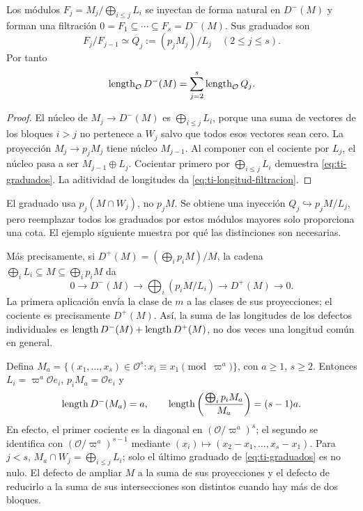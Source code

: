 \begin{proposicion}
\label{prop:ti-filtracion}
Los módulos $F_j=M_j/\bigoplus_{i\le j}L_i$ se inyectan de forma
natural en $D^-(M)$ y forman una filtración
$0=F_1\subseteq\cdots\subseteq F_s=D^-(M)$.
Sus graduados son
\begin{equation}
 F_j/F_{j-1}\simeq Q_j:=(p_jM_j)/L_j\quad(2\le j\le s).
 \label{eq:ti-graduados}
\end{equation}
Por tanto
\begin{equation}
 \operatorname{length}_{\mathcal O}D^-(M)=\sum_{j=2}^s\operatorname{length}_{\mathcal O}Q_j.
 \label{eq:ti-longitud-filtracion}
\end{equation}
\end{proposicion}
\begin{proof}
El núcleo de $M_j\to D^-(M)$ es $\bigoplus_{i\le j}L_i$,
porque una suma de vectores de los bloques $i>j$ no pertenece
a $W_j$ salvo que todos esos vectores sean cero.
La proyección $M_j\to p_jM_j$ tiene núcleo $M_{j-1}$.
Al componer con el cociente por $L_j$, el núcleo pasa a ser
$M_{j-1}\oplus L_j$. Cocientar primero por
$\bigoplus_{i\le j}L_i$ demuestra \eqref{eq:ti-graduados}.
La aditividad de longitudes da \eqref{eq:ti-longitud-filtracion}.
\end{proof}

El graduado usa $p_j(M\cap W_j)$, no $p_jM$.
Se obtiene una inyección $Q_j\hookrightarrow p_jM/L_j$,
pero reemplazar todos los graduados por estos módulos mayores
solo proporciona una cota. El ejemplo siguiente muestra
por qué las distinciones son necesarias.

Más precisamente, si $D^+(M)=(\bigoplus_i p_iM)/M$, la cadena
$\bigoplus_i L_i\subseteq M\subseteq\bigoplus_i p_iM$ da
\begin{equation}
 0\longrightarrow D^-(M)\longrightarrow
 \bigoplus_i(p_iM/L_i)\longrightarrow D^+(M)\longrightarrow0.
 \label{eq:ti-dos-defectos-exacta}
\end{equation}
La primera aplicación envía la clase de $m$ a las clases de sus
proyecciones; el cociente es precisamente $D^+(M)$.
Así, la suma de las longitudes de los defectos individuales es
$\operatorname{length} D^-(M)+\operatorname{length} D^+(M)$, no dos veces una longitud
común en general.

Defina $M_a=\{(x_1,\ldots,x_s)\in\mathcal O^s:
x_i\equiv x_1\pmod{\varpi^a}\}$, con $a\ge1$, $s\ge2$.
Entonces $L_i=\varpi^a\mathcal O e_i$, $p_iM_a=\mathcal Oe_i$ y
\begin{equation}
 \operatorname{length} D^-(M_a)=a,\qquad
 \operatorname{length}\left(\frac{\bigoplus_i p_iM_a}{M_a}\right)=(s-1)a.
 \label{eq:ti-dos-defectos}
\end{equation}
En efecto, el primer cociente es la diagonal en
$(\mathcal O/\varpi^a)^s$; el segundo se identifica con
$(\mathcal O/\varpi^a)^{s-1}$ mediante
$(x_i)\mapsto(x_2-x_1,\ldots,x_s-x_1)$.
Para $j<s$, $M_a\cap W_j=\bigoplus_{i\le j}L_i$;
solo el último graduado de \eqref{eq:ti-graduados} es no nulo.
El defecto de ampliar $M$ a la suma de sus proyecciones y el
defecto de reducirlo a la suma de sus intersecciones son distintos
cuando hay más de dos bloques.


